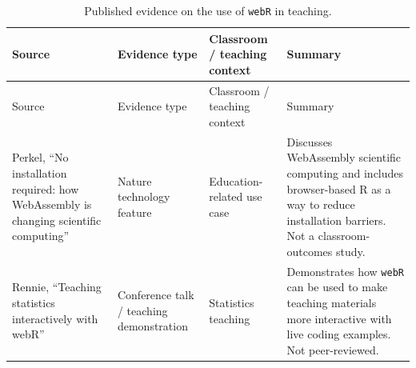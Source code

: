 \documentclass[
  12pt]{article}
\begin{document}
\begin{longtable}[]{@{}
  >{\raggedright\arraybackslash}p{}
  >{\raggedright\arraybackslash}p{}
  >{\raggedright\arraybackslash}p{}
  >{\raggedright\arraybackslash}p{}@{}}
\caption{Published evidence on the use of \texttt{webR} in
teaching.}\label{tbl-evidence-webr}\tabularnewline
\toprule\noalign{}
\begin{minipage}[b]{\linewidth}\raggedright
Source
\end{minipage} & \begin{minipage}[b]{\linewidth}\raggedright
Evidence type
\end{minipage} & \begin{minipage}[b]{\linewidth}\raggedright
Classroom / teaching context
\end{minipage} & \begin{minipage}[b]{\linewidth}\raggedright
Summary
\end{minipage} \\
\midrule\noalign{}
\endfirsthead
\toprule\noalign{}
\begin{minipage}[b]{\linewidth}\raggedright
Source
\end{minipage} & \begin{minipage}[b]{\linewidth}\raggedright
Evidence type
\end{minipage} & \begin{minipage}[b]{\linewidth}\raggedright
Classroom / teaching context
\end{minipage} & \begin{minipage}[b]{\linewidth}\raggedright
Summary
\end{minipage} \\
\midrule\noalign{}
\endhead
\bottomrule\noalign{}
\endlastfoot
Perkel, ``No installation required: how WebAssembly is changing
scientific computing'' \citep{perkel2024webassembly} & Nature technology
feature & Education-related use case & Discusses WebAssembly scientific
computing and includes browser-based R as a way to reduce installation
barriers. Not a classroom-outcomes study. \\
Rennie, ``Teaching statistics interactively with webR''
\citep{rennie2023webr} & Conference talk / teaching demonstration &
Statistics teaching & Demonstrates how \texttt{webR} can be used to make
teaching materials more interactive with live coding examples. Not
peer-reviewed. \\

\end{longtable}
\end{document}
